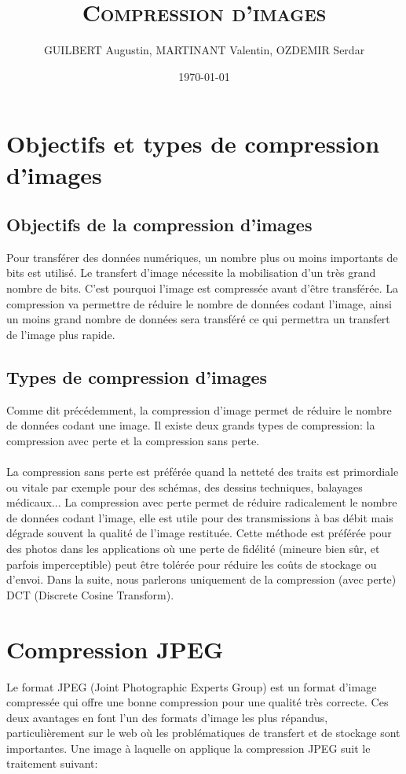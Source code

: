 \documentclass[12pt]{article}
\author{GUILBERT Augustin, MARTINANT Valentin, OZDEMIR Serdar}
\date{\today}
\title{\textsc{\textbf{Compression d'images}}}
\begin{document}
\maketitle
\newpage
\tableofcontents
\newpage
\section{Objectifs et types de compression d'images}	
\subsection{Objectifs de la compression d'images}
Pour transférer des données numériques, un nombre plus ou moins importants de bits est utilisé. Le transfert d'image nécessite la mobilisation d'un très grand nombre de bits. C'est pourquoi l'image est compressée avant d'être transférée. La compression va permettre de réduire le nombre de données codant l'image, ainsi un moins grand nombre de données sera transféré ce qui permettra un transfert de l'image plus rapide.
\subsection{Types de compression d'images}
Comme dit précédemment, la compression d'image permet de réduire le nombre de données codant une image. Il existe deux grands types de compression: la compression avec perte et la compression sans perte.
\paragraph{}
		La compression sans perte est préférée quand la netteté des traits est primordiale ou vitale par exemple pour des schémas, des dessins techniques, balayages médicaux... La compression avec perte permet de réduire radicalement le nombre de données codant l'image, elle est utile pour des transmissions à bas débit mais dégrade souvent la qualité de l'image restituée. Cette méthode est préférée pour des photos dans les applications où une perte de fidélité (mineure bien sûr, et parfois imperceptible) peut être tolérée pour réduire les coûts de stockage ou d'envoi.
Dans la suite, nous parlerons uniquement de la compression (avec perte) DCT (Discrete Cosine Transform).

\newpage
\section{Compression JPEG}
Le format JPEG (Joint Photographic Experts Group) est un format d’image compressée qui offre une bonne compression pour une qualité très correcte. Ces deux avantages en font l’un des formats d’image les plus répandus, particulièrement sur le web où les problématiques de transfert et de stockage sont importantes.
Une image à laquelle on applique la compression JPEG suit le traitement suivant:
\end{document}
